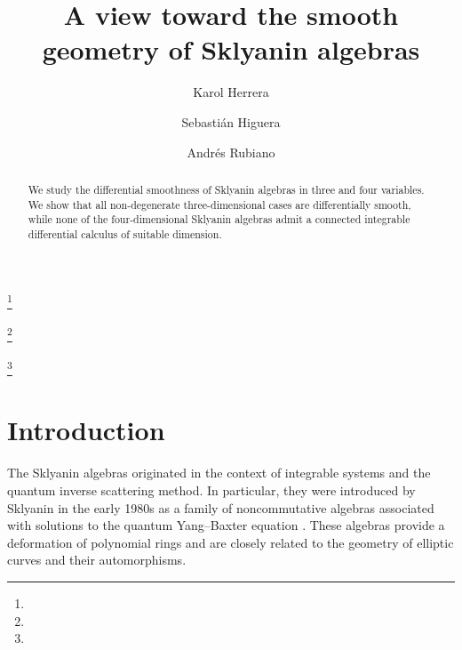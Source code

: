 \documentclass{amsart}
\theoremstyle{definition}
\theoremstyle{remark}
\numberwithin{equation}{section}
\begin{document}
\title[A view toward the smooth geometry of Sklyanin algebras]{A view toward the smooth geometry of Sklyanin algebras}


\author{Karol Herrera}
\address{Universidad ECCI}
\thanks{}


\author{Sebastián Higuera}
\address{Universidad ECCI}
\thanks{}


\author{Andr\'es Rubiano}
\address{Universidad ECCI}
\thanks{}



\date{}


\begin{abstract} 

We study the differential smoothness of Sklyanin algebras in three and four variables. We show that all non-degenerate three-dimensional cases are differentially smooth, while none of the four-dimensional Sklyanin algebras admit a connected integrable differential calculus of suitable dimension.

\end{abstract}

\maketitle


\section{Introduction}


The Sklyanin algebras originated in the context of integrable systems and the quantum inverse scattering method. In particular, they were introduced by Sklyanin in the early 1980s as a family of noncommutative algebras associated with solutions to the quantum Yang–Baxter equation \cite{Sklyanin1982}. These algebras provide a deformation of polynomial rings and are closely related to the geometry of elliptic curves and their automorphisms.
\end{document}
